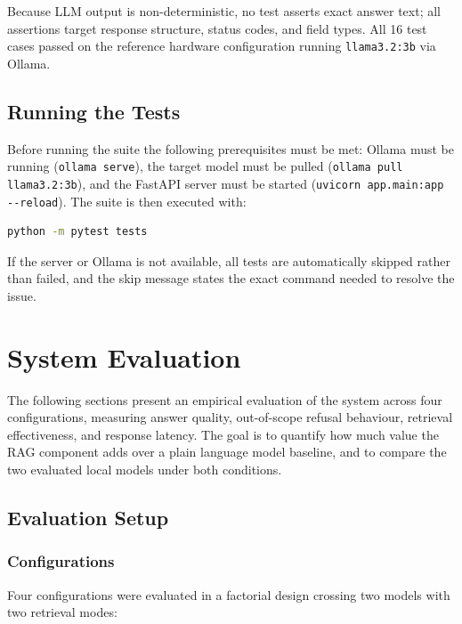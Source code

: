 Because LLM output is non-deterministic, no test asserts exact answer text;
all assertions target response structure, status codes, and field types. All 16
test cases passed on the reference hardware configuration running
\texttt{llama3.2:3b} via Ollama.

\subsection*{Running the Tests}

Before running the suite the following prerequisites must be met: Ollama must
be running (\texttt{ollama serve}), the target model must be pulled
(\texttt{ollama pull llama3.2:3b}), and the FastAPI server must be started
(\texttt{uvicorn app.main:app -{}-reload}). The suite is then executed with:

\begin{lstlisting}[language=bash]
python -m pytest tests
\end{lstlisting}

If the server or Ollama is not available, all tests are automatically skipped
rather than failed, and the skip message states the exact command needed to
resolve the issue.

\section{System Evaluation}
\label{sec:testing-system}

The following sections present an empirical evaluation of the system across
four configurations, measuring answer quality, out-of-scope refusal behaviour,
retrieval effectiveness, and response latency. The goal is to quantify how much
value the RAG component adds over a plain language model baseline, and to
compare the two evaluated local models under both conditions.

\subsection{Evaluation Setup}
\label{sec:eval-setup}

\subsubsection*{Configurations}

Four configurations were evaluated in a factorial design crossing two models
with two retrieval modes:

